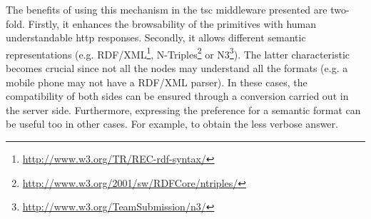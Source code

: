 The benefits of using this mechanism in the \ac{tsc} middleware presented are two-fold.
Firstly, it enhances the browsability of the primitives with human understandable \acs{http} responses. %
Secondly, it allows different semantic representations (e.g. RDF/XML\footnote{\url{http://www.w3.org/TR/REC-rdf-syntax/}}, N-Triples\footnote{\url{http://www.w3.org/2001/sw/RDFCore/ntriples/}} or N3\footnote{\url{http://www.w3.org/TeamSubmission/n3/}}).
The latter characteristic becomes crucial since not all the nodes may understand all the formats (e.g. a mobile phone may not have a RDF/XML parser).
In these cases, the compatibility of both sides can be ensured through a conversion carried out in the server side.
Furthermore, expressing the preference for a semantic format can be useful too in other cases.
For example, to obtain the less verbose answer.
